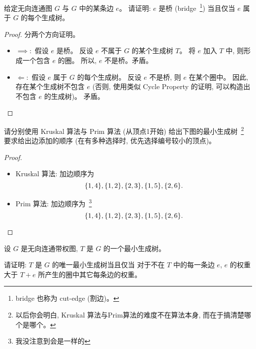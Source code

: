 \documentclass[a4paper, justified]{tufte-handout}
\begin{document}
\begin{problem}
  给定无向连通图 $G$ 与 $G$ 中的某条边 $e$。
  请证明: $e$ 是桥 (bridge~\footnote{bridge 也称为 cut-edge (割边)。})
    当且仅当 $e$ 属于 $G$ 的每个生成树。
\end{problem}

\begin{proof}
  分两个方向证明。
  \begin{itemize}
    \item $\implies:$ 假设 $e$ 是桥。
      反设 $e$ 不属于 $G$ 的某个生成树 $T$。
      将 $e$ 加入 $T$ 中, 则形成一个包含 $e$ 的圈。
      所以, $e$ 不是桥。矛盾。
    \item $\Longleftarrow:$ 假设 $e$ 属于 $G$ 的每个生成树。
      反设 $e$ 不是桥, 则 $e$ 在某个圈中。
      因此, 存在某个生成树不包含 $e$
      (否则, 使用类似 Cycle Property 的证明, 可以构造出不包含 $e$ 的生成树)。
      矛盾。
  \end{itemize}
\end{proof}

\begin{problem}[\score{4 = 2 + 2} $\star\star$]
  请分别使用 Kruskal 算法与 Prim 算法 (从顶点1开始)
  给出下图的最小生成树~\footnote{以后你会明白, Kruskal
  算法与Prim算法的难度不在算法本身, 而在于搞清楚哪个是哪个。}
  要求给出边添加的顺序 (在有多种选择时, 优先选择编号较小的顶点)。

\end{problem}

\begin{proof}
  \begin{itemize}
    \item Kruskal 算法: 加边顺序为
      \[
        \{1, 4\}, \{1, 2\}, \{2, 3\}, \{1, 5\}, \{2, 6\}.
      \]
    \item Prim 算法: 加边顺序为~\footnote{我没注意到会是一样的}
      \[
        \{1, 4\}, \{1, 2\}, \{2, 3\}, \{1, 5\}, \{2, 6\}.
      \]
  \end{itemize}
\end{proof}

\begin{problem}
  设 $G$ 是无向连通带权图, $T$ 是 $G$ 的一个最小生成树。

  \noindent 请证明: $T$ 是 $G$ 的唯一最小生成树当且仅当
  对于不在 $T$ 中的每一条边 $e$,
  $e$ 的权重大于 $T + e$ 所产生的圈中其它每条边的权重。
\end{problem}
\end{document}
